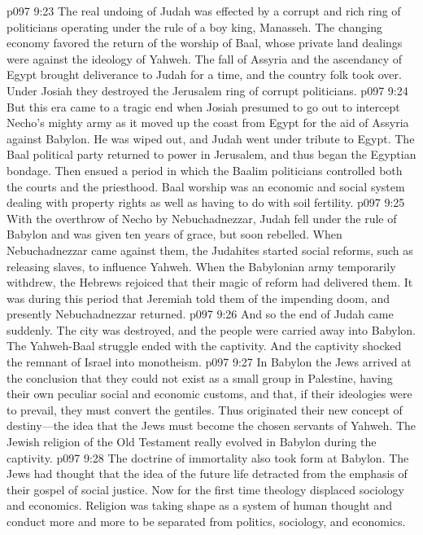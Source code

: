 \pc \vs p097 9:23 The real undoing of Judah was effected by a corrupt and rich ring of politicians operating under the rule of a boy king, Manasseh. The changing economy favored the return of the worship of Baal, whose private land dealings were against the ideology of Yahweh. The fall of Assyria and the ascendancy of Egypt brought deliverance to Judah for a time, and the country folk took over. Under Josiah they destroyed the Jerusalem ring of corrupt politicians.
\vs p097 9:24 But this era came to a tragic end when Josiah presumed to go out to intercept Necho’s mighty army as it moved up the coast from Egypt for the aid of Assyria against Babylon. He was wiped out, and Judah went under tribute to Egypt. The Baal political party returned to power in Jerusalem, and thus began the  Egyptian bondage. Then ensued a period in which the Baalim politicians controlled both the courts and the priesthood. Baal worship was an economic and social system dealing with property rights as well as having to do with soil fertility.
\vs p097 9:25 With the overthrow of Necho by Nebuchadnezzar, Judah fell under the rule of Babylon and was given ten years of grace, but soon rebelled. When Nebuchadnezzar came against them, the Judahites started social reforms, such as releasing slaves, to influence Yahweh. When the Babylonian army temporarily withdrew, the Hebrews rejoiced that their magic of reform had delivered them. It was during this period that Jeremiah told them of the impending doom, and presently Nebuchadnezzar returned.
\vs p097 9:26 And so the end of Judah came suddenly. The city was destroyed, and the people were carried away into Babylon. The Yahweh\hyp{}Baal struggle ended with the captivity. And the captivity shocked the remnant of Israel into monotheism.
\pc \vs p097 9:27 In Babylon the Jews arrived at the conclusion that they could not exist as a small group in Palestine, having their own peculiar social and economic customs, and that, if their ideologies were to prevail, they must convert the gentiles. Thus originated their new concept of destiny---the idea that the Jews must become the chosen servants of Yahweh. The Jewish religion of the Old Testament really evolved in Babylon during the captivity.
\vs p097 9:28 The doctrine of immortality also took form at Babylon. The Jews had thought that the idea of the future life detracted from the emphasis of their gospel of social justice. Now for the first time theology displaced sociology and economics. Religion was taking shape as a system of human thought and conduct more and more to be separated from politics, sociology, and economics.
